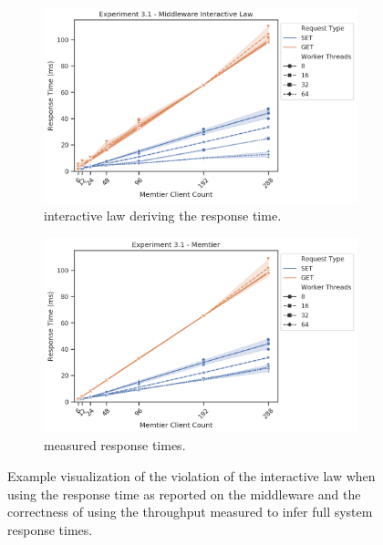 \begin{figure}
{                \begin{subfigure}[t!]{0.55\textwidth}
                    \centering
                    \includegraphics[width=1\textwidth]{../data_analysis/figures/3-1_mw_response-time-il.png}
                    \caption{\mw{} interactive law deriving the response time.\label{fig:mw_rt-il}}
                \end{subfigure}
                \begin{subfigure}[t!]{0.55\textwidth}
                    \centering
                    \includegraphics[width=1\textwidth]{../data_analysis/figures/3-1_mt_response_time.png}
                    \caption{\cli{} measured response times.\label{fig:mt_rt}}
                \end{subfigure}
            }
            \caption{Example visualization of the violation of the interactive law when using the response time as
                     reported on the middleware and the correctness of using the throughput measured to infer full
                     system response times.\label{fig:il_violation-example}}
        \end{figure}
